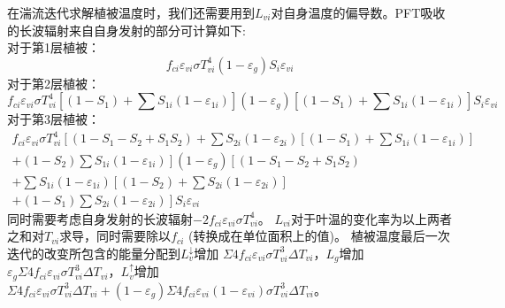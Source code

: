 在湍流迭代求解植被温度时，我们还需要用到$L_{vi}$对自身温度的偏导数。PFT吸收的长波辐射来自自身发射的部分可计算如下: \\
%
对于第1层植被：
\begin{equation}
f_{ci} \varepsilon_{vi} \sigma T_{vi}^{4}\left(1-\varepsilon_{g}\right) S_{i} \varepsilon_{vi}
\end{equation}
对于第2层植被：
\begin{equation}
f_{ci} \varepsilon_{vi} \sigma T_{vi}^{4}\left[\left(1-S_{1}\right)+\sum S_{1 i}\left(1-\varepsilon_{1 i}\right)\right]
\left(1-\varepsilon_{g}\right)\left[\left(1-S_{1}\right)+\sum S_{1 i}\left(1-\varepsilon_{1 i}\right)\right] S_{i} \varepsilon_{vi}
\end{equation}
对于第3层植被：
\begin{equation}
\begin{aligned} 
    f_{c i} \varepsilon_{v i} \sigma T_{v i}^{4}\left[\left(1-S_{1}-S_{2}+S_{1} S_{2}\right)+
    \sum S_{2 i}\left(1-\varepsilon_{2 i}\right)\left[\left(1-S_{1}\right)+\sum S_{1 i}\left(1-\varepsilon_{1 i}\right)\right]\right.\\[1ex] 
    \left.+\left(1-S_{2}\right) \sum S_{1 i}\left(1-\varepsilon_{1 i}\right)\right]\left(1-\varepsilon_{g}\right)\left[\left(1-S_{1}-S_{2}+S_{1} S_{2}\right)\right.\\[1ex] 
    +\sum S_{1 i}\left(1-\varepsilon_{1 i}\right)\left[\left(1-S_{2}\right)+\sum S_{2 i}\left(1-\varepsilon_{2 i}\right)\right] \\[1ex] 
    \left.+\left(1-S_{1}\right) 
    \sum S_{2 i}\left(1-\varepsilon_{2 i}\right)\right] S_{i} \varepsilon_{v i}
\end{aligned}
\end{equation}
同时需要考虑自身发射的长波辐射$-2f_{ci}\varepsilon_{vi}\sigma T_{vi}^4$。
$L_{vi}$对于叶温的变化率为以上两者之和对$T_{vi}$求导，同时需要除以$f_{ci}$ (转换成在单位面积上的值)。 
植被温度最后一次迭代的改变所包含的能量分配到$L_v ^\downarrow$增加
$\Sigma4f_{ci}\varepsilon_{vi}\sigma T_{vi}^3\Delta T_{vi}$，$L_{g}$增加$\varepsilon_g\Sigma4f_{ci}\varepsilon_{vi}\sigma T_{vi}^3\Delta T_{vi}$，$L_v ^\uparrow$增加$\Sigma 4 f_{ci} \varepsilon_{vi} \sigma T_{vi}^{3} \Delta T_{vi}+\left(1-\varepsilon_{g}\right) \Sigma 4 f_{ci} \varepsilon_{vi}\left(1-\varepsilon_{vi}\right) \sigma T_{vi}^{3} \Delta T_{vi}$。


